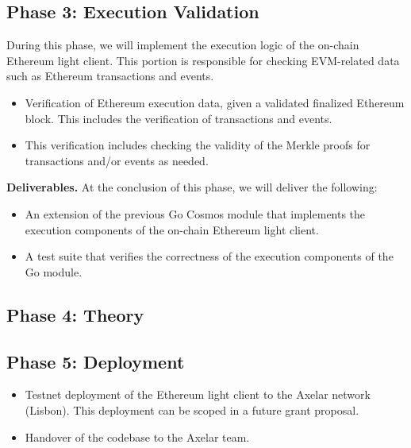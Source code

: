 \subsection{Phase 3: Execution Validation}

During this phase, we will implement the execution logic of the on-chain Ethereum light client. This portion is responsible for checking EVM-related data such as Ethereum transactions and events.

\begin{itemize}
  \item Verification of Ethereum execution data, given a validated finalized Ethereum block. This includes the verification of transactions and events.
  \item This verification includes checking the validity of the Merkle proofs for transactions and/or events as needed.
\end{itemize}

\noindent
\textbf{Deliverables.} At the conclusion of this phase, we will deliver the following:

\begin{itemize}
  \item An extension of the previous Go Cosmos module that implements the execution components of the on-chain Ethereum light client.
  \item A test suite that verifies the correctness of the execution components of the Go module.
\end{itemize}

\subsection{Phase 4: Theory}

\subsection{Phase 5: Deployment}

\begin{itemize}
  \item Testnet deployment of the Ethereum light client to the Axelar network (Lisbon). This deployment can be scoped in a future grant proposal.
  \item Handover of the codebase to the Axelar team.
\end{itemize}
